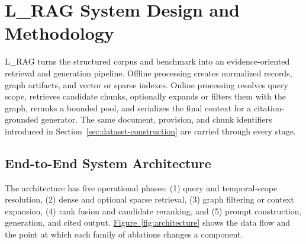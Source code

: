 \section{L\_RAG System Design and Methodology}
\label{sec:system-design}

L\_RAG turns the structured corpus and benchmark into an evidence-oriented
retrieval and generation pipeline. Offline processing creates normalized
records, graph artifacts, and vector or sparse indexes. Online processing
resolves query scope, retrieves candidate chunks, optionally expands or
filters them with the graph, reranks a bounded pool, and serializes the final
context for a citation-grounded generator. The same document, provision, and
chunk identifiers introduced in Section~\ref{sec:dataset-construction} are
carried through every stage.

\subsection{End-to-End System Architecture}
\label{sec:architecture}

The architecture has five operational phases: (1) query and temporal-scope
resolution, (2) dense and optional sparse retrieval, (3) graph filtering or
context expansion, (4) rank fusion and candidate reranking, and (5) prompt
construction, generation, and cited output. \hyperref[fig:architecture]{Figure~\ref*{fig:architecture}}
shows the data flow and the point at which each family of ablations changes a
component.

